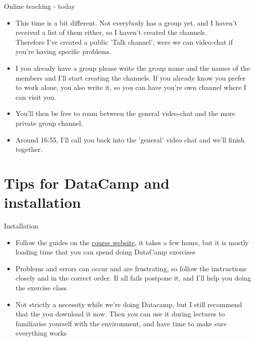 \documentclass[10pt,danish,t,10pt]{beamer}
\begin{document}
\begin{frame}{Online teaching - today}
    \begin{itemize}
        \item This time is a bit different. Not everybody has a group yet, and I haven't received a list of them either, so I haven't created the channels. \\
    Therefore I've created a public 'Talk channel', were we can video-chat if you're having specific problems.
        \item I you already have a group please write the group name and the names of the members and I'll start creating the channels. If you already know you prefer to work alone, you also write it, so you can have you're own channel where I can visit you.
        \item You'll then be free to roam between the general video-chat and the more private group channel.
        \item Around 16:55, I'll call you back into the 'general' video chat and we'll finish together.
    \end{itemize}
\end{frame}


\section{Tips for DataCamp and installation}
\begin{frame}{Installation}
    \begin{itemize}
        \item Follow the guides on the  \href{https://numeconcopenhagen.netlify.com/guides/}{\underline{course website}}, it takes a few hours, but it is mostly loading time that you can spend doing DataCamp exercises \oldWinkey
        \item Problems and errors can occur and are frustrating, so follow the instructions closely and in the correct order. If all fails postpone it, and I'll help you doing the exercise class
        \item Not strictly a necessity while we're doing Datacamp, but I still recommend that the you download it now. Then you can use it during lectures to familiarise yourself with the environment, and have time to make sure everything works
    \end{itemize}
\end{frame}
\end{document}
